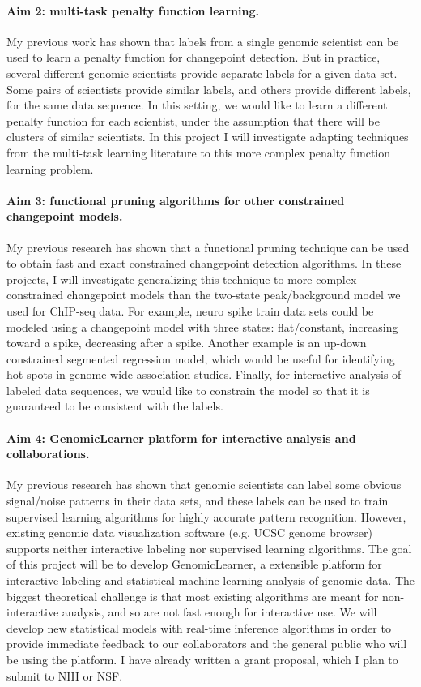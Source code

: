 \documentclass{article}
\begin{document}
\paragraph{Aim 2: multi-task penalty function learning.} My previous
work has shown that labels from a single genomic scientist can be used
to learn a penalty function for changepoint detection. But in
practice, several different genomic scientists provide separate
labels for a given data set. Some pairs of scientists provide similar
labels, and others provide different labels, for the same data
sequence. In this setting, we would like to learn a different penalty
function for each scientist, under the assumption that there will be
clusters of similar scientists. In this project I will investigate
adapting techniques from the multi-task learning literature to this
more complex penalty function learning problem.


\paragraph{Aim 3: functional pruning algorithms for other constrained
  changepoint models.} My previous research has shown that a
functional pruning technique can be used to obtain fast and exact
constrained changepoint detection algorithms. In these projects, I
will investigate generalizing this technique to more complex
constrained changepoint models than the two-state peak/background
model we used for ChIP-seq data. For example, neuro spike train data
sets could be modeled using a changepoint model with three states:
flat/constant, increasing toward a spike, decreasing after a
spike. Another example is an up-down constrained segmented regression
model, which would be useful for identifying hot spots in genome wide
association studies. Finally, for interactive analysis of labeled
data sequences, we would like to constrain the model so that it is
guaranteed to be consistent with the labels.

\paragraph{Aim 4: GenomicLearner platform for interactive analysis and
  collaborations.} My previous research has shown that genomic
scientists can label some obvious signal/noise patterns in their data
sets, and these labels can be used to train supervised learning
algorithms for highly accurate pattern recognition. However, existing
genomic data visualization software (e.g. UCSC genome browser)
supports neither interactive labeling nor supervised learning
algorithms. The goal of this project will be to develop
GenomicLearner, a extensible platform for interactive labeling and
statistical machine learning analysis of genomic data. The biggest
theoretical challenge is that most existing algorithms are meant for
non-interactive analysis, and so are not fast enough for interactive
use. We will develop new statistical models with real-time inference
algorithms in order to provide immediate feedback to our collaborators
and the general public who will be using the platform. I have already
written a grant proposal, which I plan to submit to NIH or NSF.
\end{document}
